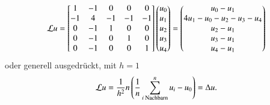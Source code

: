 \begin{equation*}
\laplaceL u =
\begin{bmatrix}
1 & -1 & 0 & 0 & 0 \\
-1 & 4 & -1 & -1 & -1 \\
0 & -1 & 1 & 0 & 0 \\
0 & -1 & 0 & 1 & 0 \\
0 & -1 & 0 & 0 & 1
\end{bmatrix}
\begin{pmatrix}
u_0 \\
u_1 \\
u_2 \\
u_3 \\
u_4
\end{pmatrix}
=
\begin{pmatrix}
u_0 - u_1 \\
4 u_1 - u_0 - u_2 - u_3 - u_4 \\
u_2 - u_1 \\
u_3 - u_1 \\
u_4 - u_1
\end{pmatrix}
\end{equation*}
oder generell ausgedr\"uckt, mit $h = 1$
\begin{equation*}
\laplaceL u = \frac{1}{h^2}n\left(\frac{1}{n}\sum_{i\text{ Nachbarn}}^{n}u_i - 
u_0\right) = \Delta u.
\end{equation*}
